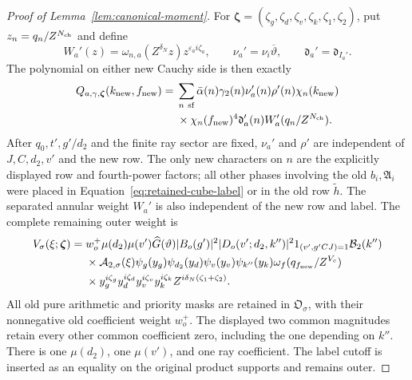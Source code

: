 \documentclass[12pt]{article}
\begin{document}
\begin{proof}[Proof of Lemma~\ref{lem:canonical-moment}]
For \(\boldsymbol\zeta=(\zeta_g,\zeta_d,\zeta_v,\zeta_k,
\zeta_1,\zeta_2)\), put \(z_n=q_n/Z^{N_{\rm ch}}\) and define
\[
 W_a'(z)=\omega_{n,a}(Z^{\delta_N}z)z^{\varepsilon_a i\zeta_a},
 \qquad \nu_a'=\nu_i\overline\vartheta,\qquad
 \mathfrak d_a'=\mathfrak d_{I_a'}.
\]
The polynomial on either new Cauchy side is then exactly
\begin{equation}\label{eq:canonical-child-polynomial}
 \begin{split}
 Q_{a,\gamma,\boldsymbol\zeta}(k_{\rm new},f_{\rm new})={}&
 \sum_{n\ {\rm sf}}\bar\alpha(n)\gamma_2(n)\nu_a'(n)\rho'(n)
 \chi_n(k_{\rm new})\\
 &\times\chi_n(f_{\rm new})^4
 \mathfrak d_a'(n)W_a'(q_n/Z^{N_{\rm ch}}).
 \end{split}
\end{equation}
After \(q_0,t',g'/d_2\) and the finite ray sector are fixed,
\(\nu_a'\) and \(\rho'\) are independent of \(J,C,d_2,v'\) and
the new row.  The only new characters on \(n\) are the explicitly
displayed row and fourth-power factors; all other phases involving
the old \(b_i,\mathfrak A_i\) were placed in
Equation~\eqref{eq:retained-cube-label} or in the old row
\(\widetilde h\).  The separated annular weight \(W_a'\) is also
independent of the new row and label.
The complete remaining outer weight is
\begin{equation}\label{eq:inverse-second-outer-weight}
 \begin{split}
 V_\sigma(\xi;\boldsymbol\zeta)={}&w_o^+\mu(d_2)\mu(v')\widehat G(\vartheta)
 |B_o(g')|^2|D_o(v';d_2,k'')|^2
 1_{(v',g'CJ)=1}\mathcal B_2(k'')\\
 &\times\mathcal A_{2,\sigma}(\xi)
 \psi_g(y_g)\psi_{d_2}(y_d)\psi_v(y_v)\psi_{k''}(y_k)
 \omega_f(q_{f_{\rm new}}/Z^{V_c})\\
 &\times y_g^{i\zeta_g}y_d^{i\zeta_d}y_v^{i\zeta_v}y_k^{i\zeta_k}
       Z^{i\delta_N(\zeta_1+\zeta_2)}.
 \end{split}
\end{equation}
All old pure arithmetic and priority masks are retained in
\(\mathfrak O_\sigma\), with their nonnegative old coefficient weight
\(w_o^+\).  The displayed two common magnitudes retain every other
common coefficient zero, including the one depending on \(k''\).
There is one \(\mu(d_2)\), one \(\mu(v')\), and one ray coefficient.
The label cutoff is inserted as an equality on the original product
supports and remains outer.


\end{proof}
\end{document}
